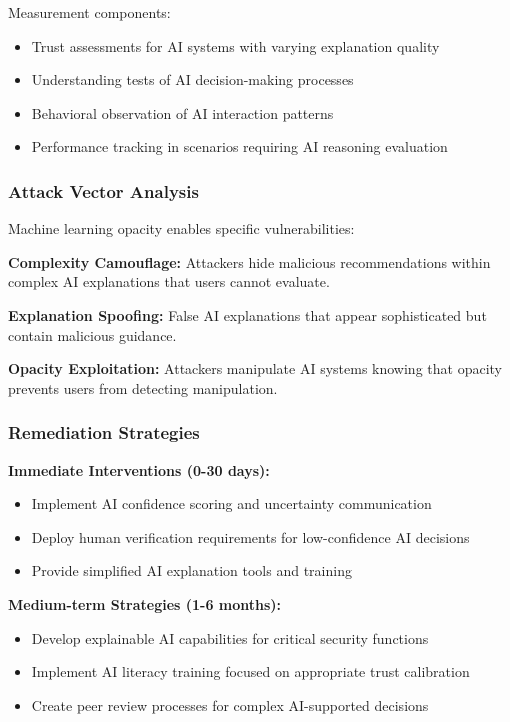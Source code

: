 \documentclass[11pt,a4paper]{article}
\begin{document}
Measurement components:
\begin{itemize}
\item Trust assessments for AI systems with varying explanation quality
\item Understanding tests of AI decision-making processes
\item Behavioral observation of AI interaction patterns
\item Performance tracking in scenarios requiring AI reasoning evaluation
\end{itemize}

\subsubsection{Attack Vector Analysis}

Machine learning opacity enables specific vulnerabilities:

\textbf{Complexity Camouflage:} Attackers hide malicious recommendations within complex AI explanations that users cannot evaluate\cite{complexity2024}.

\textbf{Explanation Spoofing:} False AI explanations that appear sophisticated but contain malicious guidance\cite{explanation2023}.

\textbf{Opacity Exploitation:} Attackers manipulate AI systems knowing that opacity prevents users from detecting manipulation\cite{opacity2024}.

\subsubsection{Remediation Strategies}

\textbf{Immediate Interventions (0-30 days):}
\begin{itemize}
\item Implement AI confidence scoring and uncertainty communication
\item Deploy human verification requirements for low-confidence AI decisions
\item Provide simplified AI explanation tools and training
\end{itemize}

\textbf{Medium-term Strategies (1-6 months):}
\begin{itemize}
\item Develop explainable AI capabilities for critical security functions
\item Implement AI literacy training focused on appropriate trust calibration
\item Create peer review processes for complex AI-supported decisions
\end{itemize}
\end{document}
